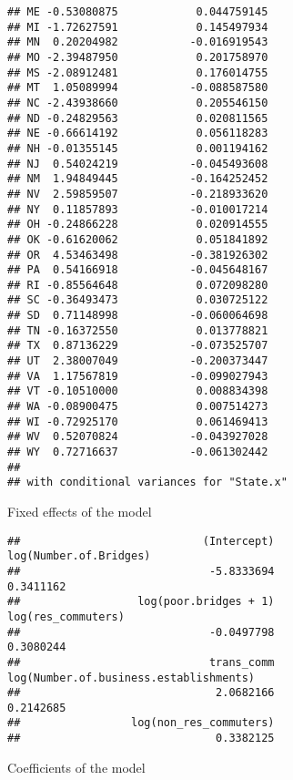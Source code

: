 \documentclass[
]{article}
\begin{document}
\begin{verbatim}
## ME -0.53080875            0.044759145
## MI -1.72627591            0.145497934
## MN  0.20204982           -0.016919543
## MO -2.39487950            0.201758970
## MS -2.08912481            0.176014755
## MT  1.05089994           -0.088587580
## NC -2.43938660            0.205546150
## ND -0.24829563            0.020811565
## NE -0.66614192            0.056118283
## NH -0.01355145            0.001194162
## NJ  0.54024219           -0.045493608
## NM  1.94849445           -0.164252452
## NV  2.59859507           -0.218933620
## NY  0.11857893           -0.010017214
## OH -0.24866228            0.020914555
## OK -0.61620062            0.051841892
## OR  4.53463498           -0.381926302
## PA  0.54166918           -0.045648167
## RI -0.85564648            0.072098280
## SC -0.36493473            0.030725122
## SD  0.71148998           -0.060064698
## TN -0.16372550            0.013778821
## TX  0.87136229           -0.073525707
## UT  2.38007049           -0.200373447
## VA  1.17567819           -0.099027943
## VT -0.10510000            0.008834398
## WA -0.08900475            0.007514273
## WI -0.72925170            0.061469413
## WV  0.52070824           -0.043927028
## WY  0.72716637           -0.061302442
## 
## with conditional variances for "State.x"
\end{verbatim}

Fixed effects of the model

\begin{verbatim}
##                            (Intercept)                 log(Number.of.Bridges) 
##                             -5.8333694                              0.3411162 
##                  log(poor.bridges + 1)                     log(res_commuters) 
##                             -0.0497798                              0.3080244 
##                             trans_comm log(Number.of.business.establishments) 
##                              2.0682166                              0.2142685 
##                 log(non_res_commuters) 
##                              0.3382125
\end{verbatim}

Coefficients of the model
\end{document}
